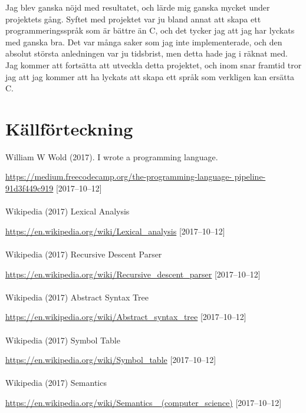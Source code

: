 \documentclass{theme}
\begin{document}
Jag blev ganska nöjd med resultatet, och lärde mig ganska mycket under
projektets gång. Syftet med projektet var ju bland annat att skapa ett 
programmeringsspråk som är bättre än C, och det tycker jag att jag har lyckats
med ganska bra. Det var många saker som jag inte implementerade, och den absolut
största anledningen var ju tidsbrist, men detta hade jag i räknat med. Jag
kommer att fortsätta att utveckla detta projektet, och inom snar framtid tror 
jag att jag kommer att ha lyckats att skapa ett språk som verkligen kan ersätta
C. 

\section{Källförteckning}

William W Wold (2017). I wrote a programming language. 

\url{https://medium.freecodecamp.org/the-programming-language-
	pipeline-91d3f449c919} [2017--10--12]\\\\
Wikipedia (2017) Lexical Analysis

\url{https://en.wikipedia.org/wiki/Lexical_analysis} [2017--10--12]\\\\
Wikipedia (2017) Recursive Descent Parser

\url{https://en.wikipedia.org/wiki/Recursive_descent_parser} [2017--10--12]\\\\
Wikipedia (2017) Abstract Syntax Tree

\url{https://en.wikipedia.org/wiki/Abstract_syntax_tree} [2017--10--12]\\\\
Wikipedia (2017) Symbol Table 

\url{https://en.wikipedia.org/wiki/Symbol_table} [2017--10--12]\\\\
Wikipedia (2017) Semantics

\url{https://en.wikipedia.org/wiki/Semantics_ (computer_science)} [2017--10--12]
\\\\
\end{document}
